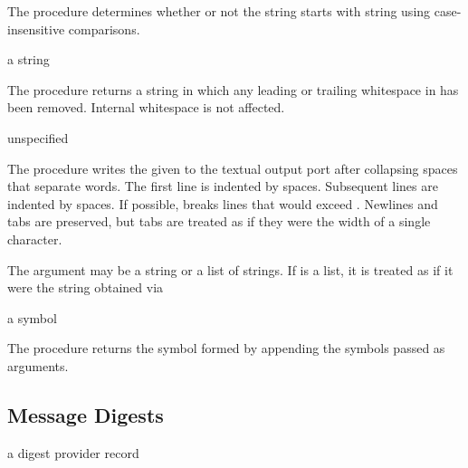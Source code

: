 The  procedure determines whether or not the
string  starts with string  using case-insensitive
comparisons.

\begin{procedure}
\end{procedure}
\returns{} a string

The  procedure returns a string in which
any leading or trailing whitespace in  has been removed.
Internal whitespace is not affected.

\begin{procedure}
\end{procedure}
\returns{} unspecified

The  procedure writes the given  to the textual output
port  after collapsing spaces that separate words. The first line is
indented by  spaces. Subsequent lines are indented by
 spaces. If possible,  breaks lines that
would exceed . Newlines and tabs are preserved, but tabs are
treated as if they were the width of a single character.

The  argument may be a string or a list of strings. If 
is a list, it is treated as if it were the string obtained via 

\begin{procedure}
\end{procedure}
\returns{} a symbol

The  procedure returns the symbol formed by
appending the symbols passed as arguments.

\subsection {Message Digests}

\begin{procedure}
\end{procedure}
\returns{} a digest provider record

